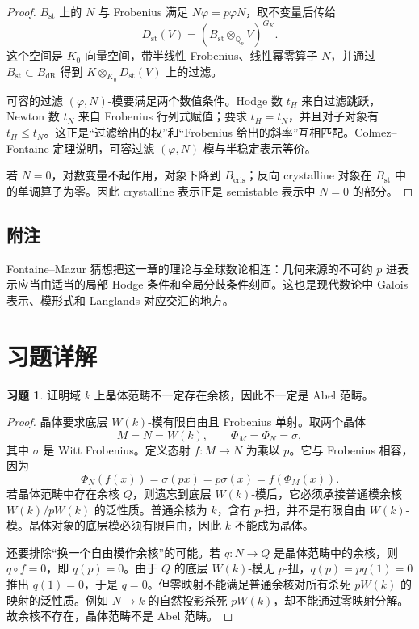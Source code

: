 \documentclass[11pt,a4paper,openany]{ctexbook}
\numberwithin{equation}{chapter}
\newcommand{\Q}{\mathbb{Q}}
\theoremstyle{plain}
\theoremstyle{definition}
\newtheorem{exercise}[theorem]{习题}
\theoremstyle{remark}
\begin{document}
\begin{proof}
$B_{\mathrm{st}}$ 上的 $N$ 与 Frobenius 满足 $N\varphi=p\varphi N$，取不变量后传给
\[
  D_{\mathrm{st}}(V)=(B_{\mathrm{st}}\otimes_{\Q_p}V)^{G_K}.
\]
这个空间是 $K_0$-向量空间，带半线性 Frobenius、线性幂零算子 $N$，并通过 $B_{\mathrm{st}}\subset B_{\mathrm{dR}}$ 得到 $K\otimes_{K_0}D_{\mathrm{st}}(V)$ 上的过滤。

可容的过滤 $(\varphi,N)$-模要满足两个数值条件。Hodge 数 $t_H$ 来自过滤跳跃，Newton 数 $t_N$ 来自 Frobenius 行列式赋值；要求 $t_H=t_N$，并且对子对象有 $t_H\le t_N$。这正是“过滤给出的权”和“Frobenius 给出的斜率”互相匹配。Colmez--Fontaine 定理说明，可容过滤 $(\varphi,N)$-模与半稳定表示等价。

若 $N=0$，对数变量不起作用，对象下降到 $B_{\mathrm{cris}}$；反向 crystalline 对象在 $B_{\mathrm{st}}$ 中的单调算子为零。因此 crystalline 表示正是 semistable 表示中 $N=0$ 的部分。
\end{proof}

\subsection{附注}

Fontaine--Mazur 猜想把这一章的理论与全球数论相连：几何来源的不可约 $p$ 进表示应当由适当的局部 Hodge 条件和全局分歧条件刻画。这也是现代数论中 Galois 表示、模形式和 Langlands 对应交汇的地方。

\section{习题详解}

\begin{exercise}
证明域 $k$ 上晶体范畴不一定存在余核，因此不一定是 Abel 范畴。
\end{exercise}

\begin{proof}
晶体要求底层 $W(k)$-模有限自由且 Frobenius 单射。取两个晶体
\[
  M=N=W(k),\qquad \Phi_M=\Phi_N=\sigma,
\]
其中 $\sigma$ 是 Witt Frobenius。定义态射 $f:M\to N$ 为乘以 $p$。它与 Frobenius 相容，因为
\[
  \Phi_N(f(x))=\sigma(px)=p\sigma(x)=f(\Phi_M(x)).
\]
若晶体范畴中存在余核 $Q$，则遗忘到底层 $W(k)$-模后，它必须承接普通模余核 $W(k)/pW(k)$ 的泛性质。普通余核为 $k$，含有 $p$-扭，并不是有限自由 $W(k)$-模。晶体对象的底层模必须有限自由，因此 $k$ 不能成为晶体。

还要排除“换一个自由模作余核”的可能。若 $q:N\to Q$ 是晶体范畴中的余核，则 $q\circ f=0$，即 $q(p)=0$。由于 $Q$ 的底层 $W(k)$-模无 $p$-扭，$q(p)=p q(1)=0$ 推出 $q(1)=0$，于是 $q=0$。但零映射不能满足普通余核对所有杀死 $pW(k)$ 的映射的泛性质。例如 $N\to k$ 的自然投影杀死 $pW(k)$，却不能通过零映射分解。故余核不存在，晶体范畴不是 Abel 范畴。
\end{proof}
\end{document}
